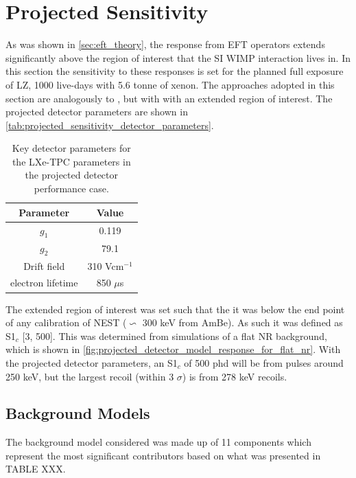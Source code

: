 \section{Projected Sensitivity}
\par
As was shown in \autoref{sec:eft_theory}, the response from EFT operators extends significantly above the region of interest that the SI WIMP interaction lives in.
In this section the sensitivity to these responses is set for the planned full exposure of LZ, 1000 live-days with 5.6 tonne of xenon.
The approaches adopted in this section are analogously to \cite{LZ_projected_sensitivity_paper_ref}, but with with an extended region of interest.
The projected detector parameters are shown in \autoref{tab:projected_sensitivity_detector_parameters}.
\begin{table}[]
    \centering
    \begin{tabular}{c|c}
        Parameter   & Value  \\ \hline
        $g_{1}$     & 0.119 \\
        $g_{2}$     & 79.1  \\
        Drift field & 310 Vcm$^{-1}$ \\
        electron lifetime & 850 $\mu$s
    \end{tabular}
    \caption{Key detector parameters for the LXe-TPC parameters in the projected detector performance case.}
    \label{tab:projected_sensitivity_detector_parameters}
\end{table}
\par
The extended region of interest was set such that the it was below the end point of any calibration of NEST ($\backsim$ 300 keV from AmBe).
As such it was defined as S1$_c$ [3, 500].
This was determined from simulations of a flat NR background, which is shown in \autoref{fig:projected_detector_model_response_for_flat_nr}.
With the projected detector parameters, an S1$_c$ of 500 phd will be from pulses around 250 keV, but the largest recoil (within 3 $\sigma$) is from 278 keV recoils.



\subsection{Background Models}
\par
The background model considered was made up of 11 components which represent the most significant contributors based on what was presented in TABLE XXX.


